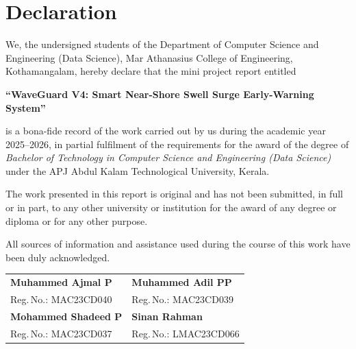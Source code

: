
\chapter*{Declaration}

We, the undersigned students of the Department of Computer Science and Engineering
(Data Science), Mar Athanasius College of Engineering, Kothamangalam, hereby declare
that the mini project report entitled

\begin{center}
  \textbf{``WaveGuard V4: Smart Near-Shore Swell Surge Early-Warning System''}
\end{center}

\noindent is a bona-fide record of the work carried out by us during the academic year
2025--2026, in partial fulfilment of the requirements for the award of the degree of
\textit{Bachelor of Technology in Computer Science and Engineering (Data Science)}
under the APJ Abdul Kalam Technological University, Kerala.

\vspace{8pt}
\noindent The work presented in this report is original and has not been submitted, in
full or in part, to any other university or institution for the award of any degree or
diploma or for any other purpose.

\vspace{8pt}
\noindent All sources of information and assistance used during the course of this work
have been duly acknowledged.

\vspace{30pt}
\begin{tabular}{p{7.5cm} p{7.5cm}}
  \textbf{Muhammed Ajmal P}             & \textbf{Muhammed Adil PP}          \\[2pt]
  Reg.\,No.: MAC23CD040                 & Reg.\,No.: MAC23CD039              \\[30pt]
  \textbf{Mohammed Shadeed P}           & \textbf{Sinan Rahman}              \\[2pt]
  Reg.\,No.: MAC23CD037                 & Reg.\,No.: LMAC23CD066             \\
\end{tabular}


